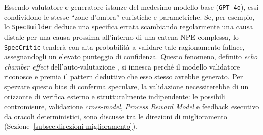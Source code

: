 Essendo valutatore e generatore istanze del medesimo modello base (\texttt{GPT-4o}), essi
condividono le stesse ``zone d'ombra'' euristiche e parametriche. Se, per esempio, lo
\texttt{SpecBuilder} deduce una specifica errata scambiando regolarmente una causa distale per
una causa prossima all'interno di una catena NPE complessa, lo \texttt{SpecCritic} tenderà con
alta probabilità a validare tale ragionamento fallace, assegnandogli un elevato punteggio di
confidenza. Questo fenomeno, definito \textit{echo chamber effect} dell'auto-valutazione
\cite{panickssery2024llm}, si innesca perché il modello validatore riconosce e premia il
pattern deduttivo che esso stesso avrebbe generato.
\enlargethispage{10pt}
Per spezzare questo bias di conferma speculare, la validazione necessiterebbe di un orizzonte di
verifica esterno e strutturalmente indipendente: le possibili contromisure, validazione
\textit{cross-model}, \textit{Process Reward Model} e feedback esecutivo da oracoli deterministici,
sono discusse tra le direzioni di miglioramento (Sezione~\ref{subsec:direzioni-miglioramento}).
